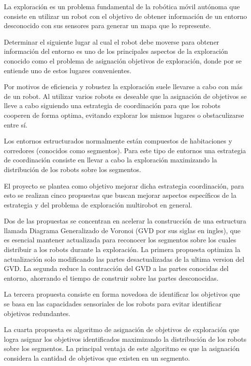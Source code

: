 La exploración es un problema fundamental de la robótica móvil autónoma que
consiste en utilizar un robot con el objetivo de obtener información de un
entorno desconocido con sus sensores para generar un mapa que lo represente.

Determinar el siguiente lugar al cual el robot debe moverse para obtener
información del entorno es uno de los principales aspectos de la exploración
conocido como el problema de asignación objetivos de exploración, donde por
 se entiende uno de estos lugares convenientes. 

Por motivos de eficiencia y robustez la exploración suele llevarse a cabo con
más de un robot. Al utilizar varios robots es deseable que la asignación de
objetivos se lleve a cabo siguiendo una estrategia de coordinación para que los
robots cooperen de forma optima, evitando explorar los mismos lugares o
obstaculizarse entre sí.

Los entornos estructurados normalmente están compuestos de habitaciones y
corredores (conocidos como segmentos). Para este tipo de entornos una
estrategia de coordinación consiste en llevar a cabo la exploración maximizando
la distribución de los robots sobre los segmentos. 

El proyecto se plantea como objetivo mejorar dicha estrategia coordinación,
para esto se realizan cinco propuestas que buscan mejorar aspectos específicos
de la estrategia y del problema de exploración multirobot en general.

Dos de las propuestas se concentran en acelerar la construcción de una
estructura llamada Diagrama Generalizado de Voronoi (GVD por sus siglas en
ingles), que es esencial mantener actualizada para reconocer los segmentos
sobre los cuales distribuir a los robots durante la exploración. La primera
propuesta optimiza la actualización solo modificando las partes desactualizadas 
de la ultima version del GVD. La segunda reduce la contracción del GVD a las
partes conocidas del entorno, ahorrando el tiempo de construir sobre las
partes desconocidas.

La tercera propuesta consiste en forma novedosa de identificar los objetivos
que se basa en las capacidades sensoriales de los robots para evitar
identificar objetivos redundantes.

La cuarta propuesta es algoritmo de asignación de objetivos de exploración que
logra asignar los objetivos identificados maximizando la distribución de los
robots sobre los segmentos. La principal ventaja de este algoritmo es que la
asignación considera la cantidad de objetivos que existen en un segmento.

